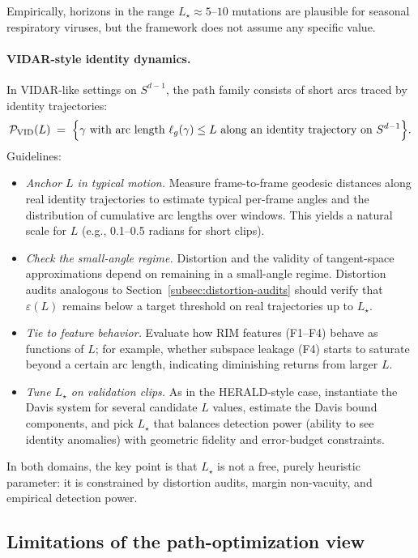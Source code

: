 \documentclass[11pt]{article}
\theoremstyle{remark}
\theoremstyle{plain}
\begin{document}
Empirically, horizons in the range $L_\star \approx 5$--$10$ mutations are plausible for seasonal
respiratory viruses, but the framework does not assume any specific value.

\paragraph{VIDAR-style identity dynamics.}
In VIDAR-like settings on $S^{d-1}$, the path family consists of short arcs traced by identity
trajectories:
\[
\mathcal{P}_{\mathrm{VID}}(L)
\;=\;
\Bigl\{ \gamma \text{ with arc length } \ell_g(\gamma) \le L \text{ along an identity trajectory on } S^{d-1} \Bigr\}.
\]
Guidelines:
\begin{itemize}[leftmargin=*]
  \item \emph{Anchor $L$ in typical motion.} Measure frame-to-frame geodesic distances along real
  identity trajectories to estimate typical per-frame angles and the distribution of cumulative arc
  lengths over windows. This yields a natural scale for $L$ (e.g., 0.1--0.5 radians for short clips).

  \item \emph{Check the small-angle regime.} Distortion and the validity of tangent-space
  approximations depend on remaining in a small-angle regime. Distortion audits analogous to
  Section~\ref{subsec:distortion-audits} should verify that $\varepsilon(L)$ remains below a target
  threshold on real trajectories up to $L_\star$.

  \item \emph{Tie to feature behavior.} Evaluate how RIM features (F1--F4) behave as functions of
  $L$; for example, whether subspace leakage (F4) starts to saturate beyond a certain arc length,
  indicating diminishing returns from larger $L$.

  \item \emph{Tune $L_\star$ on validation clips.} As in the HERALD-style case, instantiate the
  Davis system for several candidate $L$ values, estimate the Davis bound components, and pick
  $L_\star$ that balances detection power (ability to see identity anomalies) with geometric fidelity
  and error-budget constraints.
\end{itemize}

In both domains, the key point is that $L_\star$ is not a free, purely heuristic parameter: it is
constrained by distortion audits, margin non-vacuity, and empirical detection power.

\subsection{Limitations of the path-optimization view}
\label{subsec:path-limitations}
\end{document}
